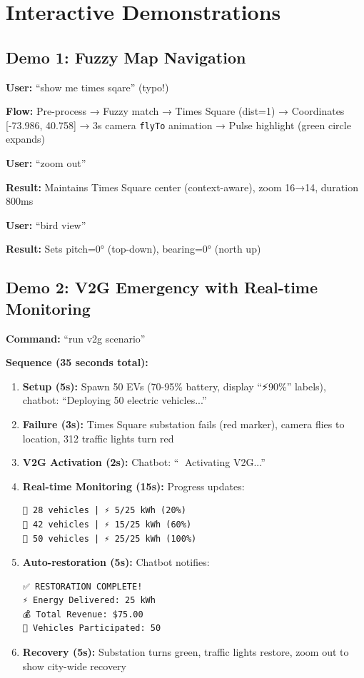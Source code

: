 \documentclass[sigconf]{acmart}
\begin{document}
\section{Interactive Demonstrations}

\subsection{Demo 1: Fuzzy Map Navigation}

\textbf{User:} ``show me times sqare'' (typo!)

\textbf{Flow:} Pre-process → Fuzzy match → Times Square (dist=1) → Coordinates [-73.986, 40.758] → 3s camera \texttt{flyTo} animation → Pulse highlight (green circle expands)

\textbf{User:} ``zoom out''

\textbf{Result:} Maintains Times Square center (context-aware), zoom 16→14, duration 800ms

\textbf{User:} ``bird view''

\textbf{Result:} Sets pitch=0° (top-down), bearing=0° (north up)

\subsection{Demo 2: V2G Emergency with Real-time Monitoring}

\textbf{Command:} ``run v2g scenario''

\textbf{Sequence (35 seconds total):}
\begin{enumerate}
    \item \textbf{Setup (5s):} Spawn 50 EVs (70-95\% battery, display ``⚡90\%'' labels), chatbot: ``Deploying 50 electric vehicles...''
    \item \textbf{Failure (3s):} Times Square substation fails (red marker), camera flies to location, 312 traffic lights turn red
    \item \textbf{V2G Activation (2s):} Chatbot: ``🚗 Activating V2G...''
    \item \textbf{Real-time Monitoring (15s):} Progress updates:
\begin{verbatim}
🚗 28 vehicles | ⚡ 5/25 kWh (20%)
🚗 42 vehicles | ⚡ 15/25 kWh (60%)
🚗 50 vehicles | ⚡ 25/25 kWh (100%)
\end{verbatim}
    \item \textbf{Auto-restoration (5s):} Chatbot notifies:
\begin{verbatim}
✅ RESTORATION COMPLETE!
⚡ Energy Delivered: 25 kWh
💰 Total Revenue: $75.00
🚗 Vehicles Participated: 50
\end{verbatim}
    \item \textbf{Recovery (5s):} Substation turns green, traffic lights restore, zoom out to show city-wide recovery
\end{enumerate}
\end{document}
